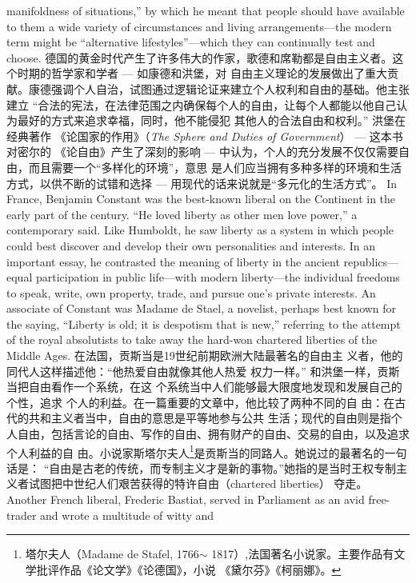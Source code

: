\begin{paracol}{2}
manifoldness of situations,'' by which he meant that people
should have available to them a wide variety of circumstances
and living arrangements---the modern term might be ``alternative lifestyles''---which they can continually test and choose. 
\switchcolumn
德国的黄金时代产生了许多伟大的作家，歌德和席勒都是自由主义者。这个时期的哲学家和学者 --- 如康德和洪堡，对
自由主义理论的发展做出了重大贡献。康德强调个人自治，试图通过逻辑论证来建立个人权利和自由的基础。他主张建立
“合法的宪法，在法律范围之内确保每个人的自由，让每个人都能以他自己认为最好的方式来追求幸福，同时，他不能侵犯
其他人的合法自由和权利。” 洪堡在经典著作 《论国家的作用》（\textit{The Sphere and Duties of Government}） --- 这本书对密尔的 《论自由》产生了深刻的影响 --- 中认为，个人的充分发展不仅仅需要自由，而且需要一个“多样化的环境”，意思
是人们应当拥有多种多样的环境和生活方式，以供不断的试错和选择 --- 用现代的话来说就是“多元化的生活方式”。
\switchcolumn*
In France, Benjamin Constant was the best-known liberal on the
Continent in the early part of the century. ``He loved liberty as
other men love power,'' a contemporary said. Like Humboldt,
he saw liberty as a system in which people could best discover
and develop their own personalities and interests. In an important essay, he contrasted the meaning of liberty in the ancient
republics---equal participation in public life---with modern liberty---the individual freedoms to speak, write, own property,
trade, and pursue one's private interests. An associate of Constant was Madame de Stael, a novelist, perhaps best known for
the saying, ``Liberty is old; it is despotism that is new,'' referring
to the attempt of the royal absolutists to take away the hard-won chartered liberties of the Middle Ages.
\switchcolumn
在法国，贡斯当是19世纪前期欧洲大陆最著名的自由主
义者，他的同代人这样描述他：“他热爱自由就像其他人热爱
权力一样。” 和洪堡一样，贡斯当把自由看作一个系统，在这
个系统当中人们能够最大限度地发现和发展自己的个性，追求
个人的利益。在一篇重要的文章中，他比较了两种不同的自
由：在古代的共和主义者当中，自由的意思是平等地参与公共
生活；现代的自由则是指个人自由，包括言论的自由、写作的自由、拥有财产的自由、交易的自由，以及追求个人利益的自
由。小说家斯塔尔夫人\footnote{塔尔夫人（Madame de Stafel, 1766$\sim$ 1817）,法国著名小说家。主要作品有文学批评作品《论文学》《论德国》，小说 《黛尔芬》《柯丽娜》。}是贡斯当的同路人。她说过的最著名的一句话是： “自由是古老的传统，而专制主义才是新的事物。”她指的是当时王权专制主义者试图把中世纪人们艰苦获得的特许自由（chartered liberties） 夺走。
\switchcolumn*
Another French liberal, Frederic Bastiat, served in Parliament as an avid free-trader and wrote a multitude of witty and

\end{paracol}
